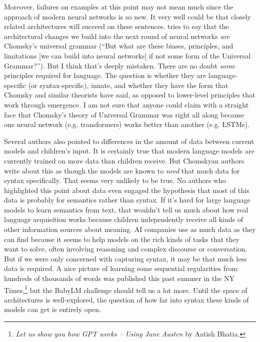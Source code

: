 \documentclass[output=paper,colorlinks,citecolor=brown]{langscibook}
\begin{document}
Moreover, failures on examples at this point may not mean much since the approach of modern neural networks is so new. It very well could be that closely related architectures will succeed on these sentences. \citet{kodner2023linguistics} tries to say that the architectural changes we build into the next round of neural networks \textit{are} Chomsky's universal grammar (``But what are these biases, principles, and limitations [we can build into neural networks] if not some form of the  Universal Grammar?''). But I think that's deeply mistaken. There are no doubt \textit{some} principles required for language. The question is whether they are language-specific (or syntax-specific), innate, and whether they have the form that Chomsky and similar theorists have said, as opposed to lower-level principles that work through emergence. I am not sure that anyone could claim with a straight face that Chomsky's theory of Universal Grammar was right all along because one neural network (e.g. transformers) works better than another (e.g. LSTMs). 


Several authors also pointed to differences in the amount of data between current models and children's input. It is certainly true that modern language models are currently trained on more data than children receive. But Chomskyan authors write about this as though the models are known to \textit{need} that much data for syntax specifically. That seems very unlikely to be true. No authors who highlighted this point about data even engaged the hypothesis that most of this data is probably for semantics rather than syntax. If it's hard for large language models to learn semantics from text, that wouldn't tell us much about how real language acquisition works because children independently receive all kinds of other information sources about meaning. AI companies use as much data as they can find because it seems to help models on the rich kinds of tasks that they want to solve, often involving reasoning and complex discourse or conversation. But if we were only concerned with capturing syntax, it may be that much less data is required. A nice picture of learning some sequential regularities from hundreds of thousands of words was published this past summer in the NY Times,\footnote{\textit{Let us show you how GPT works -- Using Jane Austen} by  Aatish Bhatia.} but the BabyLM challenge should tell us a lot more. Until the space of architectures is well-explored, the question of how far into syntax these kinds of models can get is entirely open. 
\end{document}
